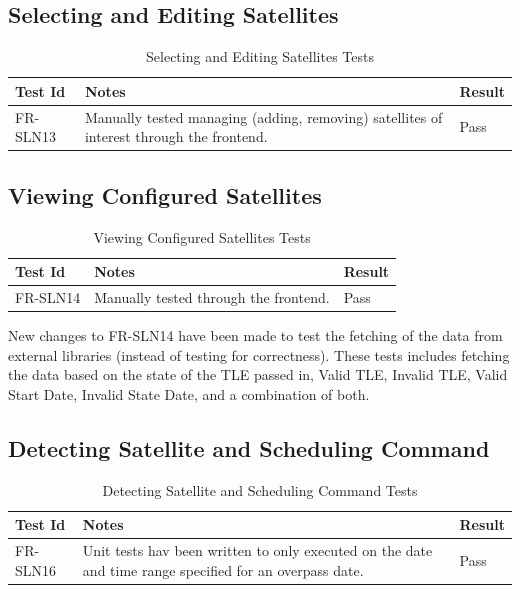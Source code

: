 \documentclass[12pt, titlepage]{article}
\begin{document}
\subsection{Selecting and Editing Satellites}

\begin{center}
\begin{longtable}{|p{2cm} | p{8cm} |p{2cm}| }
\caption{Selecting and Editing Satellites Tests}
\hline
\textbf{Test Id} & \textbf{Notes} & \textbf{Result} \\
\hline
FR-SLN13 & Manually tested managing (adding, removing) satellites of interest through the frontend. & Pass \\
\hline

\end{longtable}
\end{center}

\subsection{Viewing Configured Satellites}

\begin{center}
\begin{longtable}{|p{2cm} | p{8cm} |p{2cm}| }
\caption{Viewing Configured Satellites Tests}
\hline
\textbf{Test Id} & \textbf{Notes} & \textbf{Result} \\
\hline
FR-SLN14 & Manually tested through the frontend. & Pass \\
\hline

\end{longtable}
\end{center}

New changes to FR-SLN14 have been made to test the fetching of the
data from external libraries (instead of testing for correctness). These
tests includes fetching the data based on the state of the TLE passed
in, Valid TLE, Invalid TLE, Valid Start Date, Invalid State Date, and
a combination of both.

\subsection{Detecting Satellite and Scheduling Command}

\begin{center}
\begin{longtable}{|p{2cm} | p{8cm} |p{2cm}| }
\caption{Detecting Satellite and Scheduling Command Tests}
\hline
\textbf{Test Id} & \textbf{Notes} & \textbf{Result} \\
\hline
FR-SLN16 & Unit tests hav been written to only executed on the date and time range specified for an overpass date. & Pass \\
\hline

\end{longtable}
\end{center}
\end{document}
